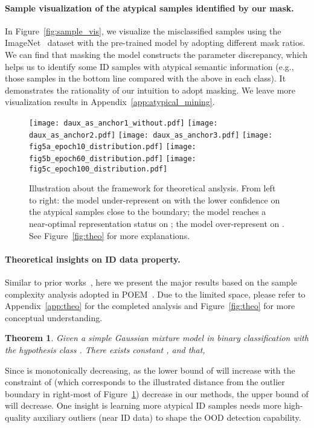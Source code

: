 \documentclass{article}
\theoremstyle{plain}
\newtheorem{theorem}{Theorem}[section]
\theoremstyle{definition}
\theoremstyle{remark}
\begin{document}
\paragraph{Sample visualization of the atypical samples identified by our mask.} 
In Figure~\ref{fig:sample_vis}, we visualize the misclassified samples using the ImageNet~\citep{deng2009imagenet} dataset with the pre-trained model by adopting different mask ratios. We can find that masking the model constructs the parameter discrepancy, which helps us to identify some ID samples with atypical semantic information (e.g., those samples in the bottom line compared with the above in each class). It demonstrates the rationality of our intuition to adopt masking. We leave more visualization results in Appendix~\ref{app:atypical_mining}.


\begin{figure}[t!]
    \begin{center}
    \texttt{[image: daux\_as\_anchor1\_without.pdf]}
    \texttt{[image: daux\_as\_anchor2.pdf]}
    \texttt{[image: daux\_as\_anchor3.pdf]}
    \texttt{[image: fig5a\_epoch10\_distribution.pdf]}
    \texttt{[image: fig5b\_epoch60\_distribution.pdf]}
    \texttt{[image: fig5c\_epoch100\_distribution.pdf]}
    \end{center}
    \vspace{-4mm}
    \caption{Illustration about the framework for theoretical anslysis. From left to right: the model under-represent on  with the lower confidence on the atypical samples close to the boundary; the model reaches a near-optimal representation status on ; the model over-represent on . See Figure~\ref{fig:theo} for more explanations.
    }
    \label{fig5:theo_ill}
    \vspace{-3mm}
\end{figure}

\paragraph{Theoretical insights on ID data property.} Similar to prior works~\citep{LeeLLS18, SehwagCM21}, here we present the major results based on the sample complexity analysis adopted in POEM~\citep{ming2022poem}. Due to the limited space,  please refer to Appendix~\ref{app:theo} for the completed analysis and Figure~\ref{fig:theo} for more conceptual understanding.

\begin{theorem}
    Given a simple Gaussian mixture model in binary classification with the hypothesis class . There exists constant ,  and  that,
    
\end{theorem}
Since  is monotonically decreasing, as the lower bound of  will increase with the constraint of  (which corresponds to the illustrated distance from the outlier boundary in right-most of Figure~\ref{fig5:theo_ill}) decrease in our methods, the upper bound of  will decrease. One insight is learning more atypical ID samples needs more high-quality auxiliary outliers (near ID data) to shape the OOD detection capability.
\end{document}
